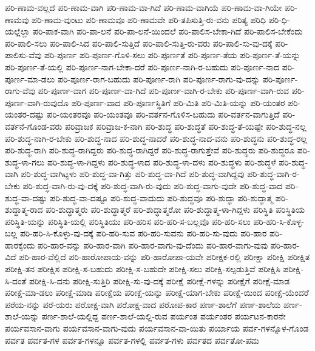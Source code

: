 {ಪರಿ-ಣಾಮ-ವಲ್ಲದೆ
ಪರಿ-ಣಾಮ-ವಾಗಿ
ಪರಿ-ಣಾಮ-ವಾ-ಗಿದೆ
ಪರಿ-ಣಾಮ-ವಾಗಿಯೆ
ಪರಿ-ಣಾಮ-ವಾ-ಗಿಯೇ
ಪರಿ-ಣಾಮವು
ಪರಿ-ಣಾಮ-ವುಂಟು
ಪರಿ-ಣಾಮವೂ
ಪರಿ-ಣಾಮವೇ
ಪರಿ-ತಪಿಸುತ್ತಿ-ರು-ವನು
ಪರಿತ್ಯ
ಪರಿಧಿ
ಪರಿ-ಧಿ-ಯಲ್ಲೆಲ್ಲಾ
ಪರಿ-ಪಾಕ-ವಾಗಿ
ಪರಿ-ಪಾ-ಲನೆ
ಪರಿ-ಪಾ-ಲನೆ-ಯಿಂದಲೆ
ಪರಿ-ಪಾಲಿಸ-ಬೇಕಾ-ಗಿದೆ
ಪರಿ-ಪಾಲಿಸ-ಬೇಕೆಂದು
ಪರಿ-ಪಾಲಿ-ಸಲು
ಪರಿ-ಪಾಲಿ-ಸಿದ
ಪರಿ-ಪಾಲಿ-ಸುತ್ತಿದೆ
ಪರಿ-ಪಾಲಿ-ಸುತ್ತಿ-ರು-ವರು
ಪರಿ-ಪಾಲಿ-ಸು-ವು-ದಕ್ಕೆ
ಪರಿ-ಪಾಲಿಸು-ವೆವು
ಪರಿ-ಪೂರ್ಣ
ಪರಿ-ಪೂರ್ಣ-ಗೊಳಿ-ಸಲು
ಪರಿ-ಪೂರ್ಣತೆ
ಪರಿ-ಪೂರ್ಣ-ತೆಯ
ಪರಿ-ಪೂರ್ಣ-ತೆ-ಯನ್ನು
ಪರಿ-ಪೂರ್ಣ-ತೆ-ಯಲ್ಲಿ
ಪರಿ-ಪೂರ್ಣ-ನಾಗ-ಬೇಕಾ-ದರೆ
ಪರಿ-ಪೂರ್ಣ-ನಾಗಿ-ರ-ಬಹುದು
ಪರಿ-ಪೂರ್ಣ-ನಾದ
ಪರಿ-ಪೂರ್ಣ-ಮಾ-ಡಲು
ಪರಿ-ಪೂರ್ಣ-ರಾಗ-ಬಹುದು
ಪರಿ-ಪೂರ್ಣ-ರಾಗಿ
ಪರಿ-ಪೂರ್ಣ-ರಾಗು-ವು-ದನ್ನು
ಪರಿ-ಪೂರ್ಣ-ರಾಗು-ವೆವು
ಪರಿ-ಪೂರ್ಣ-ವಾಗ
ಪರಿ-ಪೂರ್ಣ-ವಾ-ಗಿದೆ
ಪರಿ-ಪೂರ್ಣ-ವಾಗಿ-ರ-ಬೇಕು
ಪರಿ-ಪೂರ್ಣ-ವಾಗಿ-ರುವ
ಪರಿ-ಪೂರ್ಣ-ವಾಗಿ-ರುವುದೊ
ಪರಿ-ಪೂರ್ಣ-ವಾದ
ಪರಿ-ಪೂರ್ಣಸ್ಥಿತಿಗೆ
ಪರಿ-ಮಿತಿ
ಪರಿ-ಮಿತಿ-ಯನ್ನು
ಪರಿ-ಯಂತರ
ಪರಿ-ಯಂತರ-ದಷ್ಟು
ಪರಿ-ಯಂತರವೂ
ಪರಿ-ಯಂತವೂ
ಪರಿ-ವರ್ತನ-ಗೊಳಿಸ-ಬಹುದು
ಪರಿ-ವರ್ತನ-ವಾಗುತ್ತಿದೆ
ಪರಿ-ವರ್ತನೆ-ಗೊಂಡ-ವರು
ಪರಿವ್ರಾಜಕ
ಪರಿವ್ರಾಜ-ಕ-ನಾಗಿ
ಪರಿ-ಶುದ್ಧ
ಪರಿ-ಶುದ್ಧತೆ
ಪರಿ-ಶುದ್ಧ-ತೆ-ಯಷ್ಟೇ
ಪರಿ-ಶುದ್ಧ-ನಲ್ಲ
ಪರಿ-ಶುದ್ಧ-ನಾಗಿ-ರ-ಬೇಕು
ಪರಿ-ಶುದ್ಧ-ನಾದ
ಪರಿ-ಶುದ್ಧ-ನಾದರೆ
ಪರಿ-ಶುದ್ಧ-ನಾದ-ವನು
ಪರಿ-ಶುದ್ಧನು
ಪರಿ-ಶುದ್ಧ-ರಲ್ಲ
ಪರಿ-ಶುದ್ಧ-ರಾಗಿ
ಪರಿ-ಶುದ್ಧ-ರಾಗಿದ್ದರು
ಪರಿ-ಶುದ್ಧ-ರಾಗಿದ್ದರೆ
ಪರಿ-ಶುದ್ಧ-ರಾಗುತ್ತೇವೆ
ಪರಿ-ಶುದ್ಧರು
ಪರಿ-ಶುದ್ಧರೂ
ಪರಿ-ಶುದ್ಧ-ಳಾ-ಗಲು
ಪರಿ-ಶುದ್ಧ-ಳಾ-ಗಿದ್ದಳು
ಪರಿ-ಶುದ್ಧ-ಳಾದ
ಪರಿ-ಶುದ್ಧ-ಳಾ-ದಳು
ಪರಿ-ಶುದ್ಧಳು
ಪರಿ-ಶುದ್ಧಳೆ
ಪರಿ-ಶುದ್ಧ-ವಾಗಿ
ಪರಿ-ಶುದ್ಧ-ವಾಗಿಟ್ಟಳು
ಪರಿ-ಶುದ್ಧ-ವಾ-ಗಿತ್ತು
ಪರಿ-ಶುದ್ಧ-ವಾ-ಗಿದೆ
ಪರಿ-ಶುದ್ಧ-ವಾಗಿದ್ದವು
ಪರಿ-ಶುದ್ಧ-ವಾಗಿ-ರ-ಬೇಕು
ಪರಿ-ಶುದ್ಧ-ವಾಗಿ-ರು-ವು-ದಕ್ಕೆ
ಪರಿ-ಶುದ್ಧ-ವಾಗಿ-ರು-ವುದು
ಪರಿ-ಶುದ್ಧ-ವಾಗು-ವುದೇ
ಪರಿ-ಶುದ್ಧ-ವಾದ
ಪರಿ-ಶುದ್ಧ-ವಾ-ದಷ್ಟು
ಪರಿ-ಶುದ್ಧ-ವಾ-ದಷ್ಟೂ
ಪರಿ-ಶುದ್ಧ-ವಾದುದು
ಪರಿ-ಶುದ್ಧವೂ
ಪರಿ-ಶುದ್ಧಾ
ಪರಿ-ಶುದ್ಧಾತ್ಮ
ಪರಿ-ಶುದ್ಧಾತ್ಮ-ರಾದ
ಪರಿ-ಶುದ್ಧಾತ್ಮರು
ಪರಿ-ಶುದ್ಧಾತ್ಮರೆ
ಪರಿ-ಶುದ್ಧಾತ್ಮರೋ
ಪರಿ-ಶುದ್ಧಾತ್ಮ-ಳಾ-ಗಿದ್ದಳು
ಪರಿಸ್ಥಿತಿ
ಪರಿಸ್ಥಿತಿಯ
ಪರಿಸ್ಥಿತಿ-ಯನ್ನು
ಪರಿಸ್ಥಿತಿ-ಯಲ್ಲಿ
ಪರಿಸ್ಥಿತಿಯು
ಪರಿ-ಹರಿಸ
ಪರಿ-ಹರಿ-ಸ-ಬಲ್ಲವೊ
ಪರಿ-ಹರಿ-ಸಲು
ಪರಿ-ಹರಿ-ಸಿ-ಕೊಳ್ಳ-ಬಲ್ಲ
ಪರಿ-ಹರಿ-ಸಿ-ಕೊಳ್ಳು-ವು-ದಕ್ಕೆ
ಪರಿ-ಹರಿ-ಸುವ
ಪರಿ-ಹರಿ-ಸುವನು
ಪರಿ-ಹರಿ-ಸು-ವುದು
ಪರಿ-ಹಾರ
ಪರಿ-ಹಾರಕ್ಕೆಂದು
ಪರಿ-ಹಾರ-ವನ್ನು
ಪರಿ-ಹಾರ-ವಾಗಿ
ಪರಿ-ಹಾರ-ವಾಗು-ವು-ದೆಂದು
ಪರಿ-ಹಾರ-ವಾಗು-ವುವು
ಪರಿ-ಹಾರ-ವಿದೆ
ಪರಿ-ಹಾರ-ವೆಲ್ಲಿದೆ
ಪರಿ-ಹಾರೋಪಾಯ-ವನ್ನು
ಪರಿ-ಹಾರೋಪಾ-ಯವೇ
ಪರೀಕ್ಷಕ-ರಲ್ಲಿ
ಪರೀಕ್ಷಾ
ಪರೀಕ್ಷಿ
ಪರೀಕ್ಷಿತ
ಪರೀಕ್ಷಿ-ತನ
ಪರೀಕ್ಷಿಸ
ಪರೀಕ್ಷಿ-ಸ-ಬಹುದು
ಪರೀಕ್ಷಿ-ಸ-ಬಹುದೇ
ಪರೀಕ್ಷಿ-ಸಲು
ಪರೀಕ್ಷಿ-ಸಲ್ಪಡುತ್ತಿವೆ
ಪರೀಕ್ಷಿಸಿ
ಪರೀಕ್ಷಿ-ಸಿ-ದಂತೆ
ಪರೀಕ್ಷಿ-ಸಿ-ದನು
ಪರೀಕ್ಷಿ-ಸುತ್ತಿರಿ
ಪರೀಕ್ಷಿ-ಸು-ವು-ದಕ್ಕೆ
ಪರೀಕ್ಷೆ
ಪರೀಕ್ಷೆ-ಗಳನ್ನು
ಪರೀಕ್ಷೆಗೆ
ಪರೀಕ್ಷೆ-ಮಾಡ
ಪರೀಕ್ಷೆ-ಮಾ-ಡಲು
ಪರೀಕ್ಷೆ-ಮಾಡಿ
ಪರೀಕ್ಷೆಯ
ಪರೀಕ್ಷೆ-ಯನ್ನು
ಪರೀಕ್ಷೆ-ಯಾಗ-ಬೇಕು
ಪರೀಕ್ಷೆ-ಯಿಂದ
ಪರೀಕ್ಷೆ-ಯೆಂದರೆ
ಪರೆಯ-ನನ್ನು
ಪರೆ-ಯರು
ಪರೋಕ್ಷ-ವಾಗಿ
ಪರೋಕ್ಷ-ವಾದ
ಪರೋಪ-ಕಾರ
ಪರ್ಣ-ಶಾಲೆಗೆ
ಪರ್ಣ-ಶಾಲೆಯ
ಪರ್ಣ-ಶಾಲೆ-ಯನ್ನು
ಪರ್ಣ-ಶಾಲೆ-ಯಲ್ಲಿದ್ದ
ಪರ್ಣ-ಶಾಲೆ-ಯಲ್ಲಿ-ರುವ
ಪರ್ಯಂತ
ಪರ್ಯಂತರ
ಪರ್ಯಟನ-ಕಾರನೇ
ಪರ್ಯವಸಾನ-ವಾಗು
ಪರ್ಯವಸಾನ-ವಾಗು-ವುದು
ಪರ್ಯವಸಾನ-ವಾ-ಯಿತು
ಪರ್ಯಾಯ
ಪರ್ವ-ಗಳನ್ನೊಳ-ಗೊಂಡ
ಪರ್ವತ
ಪರ್ವತ-ಗಳ
ಪರ್ವತ-ಗಳನ್ನೂ
ಪರ್ವತ-ಗಳಲ್ಲಿ
ಪರ್ವತ-ಗಳು
ಪರ್ವತದ
ಪರ್ವತೋ-ಪಮ
}
